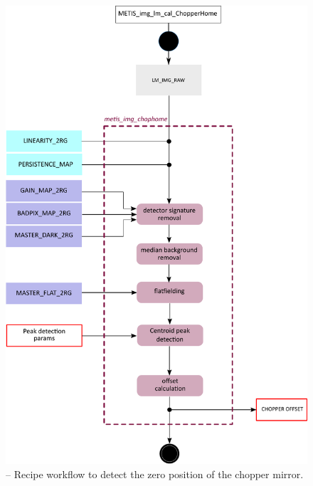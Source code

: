 \begin{figure}[ht]
  \centering
  \includegraphics[width=0.5\textheight]{figures/metis_img_chophome_v0.83.pdf}
  \caption[Recipe: ]{ --
    Recipe workflow to detect the zero position of the chopper mirror.}
  \label{Fig:rec_chop_home}
\end{figure}

